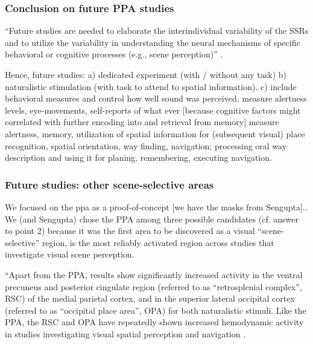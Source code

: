 \subsubsection{Conclusion on future PPA studies}

``Future studies are needed to elaborate the interindividual variability of the
SSRs and to utilize the variability in understanding the neural mechanisms of
specific behavioral or cognitive processes (e.g., scene perception)''
\citep{zhen2017quantifying}.

Hence, future studies:
%
a) dedicated experiment (with / without any task)
%
b) naturalistic stimulation (with task to attend to spatial information).
%
c) include behavioral measures and control how well sound was perceived, measure
alertness levels, eye-movements, self-reports of what ever [because cognitive
factors might correlated with further encoding into and retrieval from memory]
%
measure alertness, memory, utilization of spatial information for (subsequent
visual) place recognition, spatial orientation, way finding, navigation;
%
processing oral way description and using it for planing,
remembering, executing navigation.


\subsubsection{Future studies: other scene-selective areas}


We focused on the \ac{ppa} as a proof-of-concept [we have the masks from
Sengupta]..
%
We (and Sengupta) chose the PPA among three possible candidates (cf. answer to
point 2) because it was the first area to be discovered as a visual
``scene-selective'' region, is the most reliably activated region across studies
that investigate visual scene perception.

``Apart from the PPA, results show significantly increased activity in the
ventral precuneus and posterior cingulate region (referred to as ``retrosplenial
complex'', RSC) of the medial parietal cortex, and in the superior lateral
occipital cortex (referred to as ``occipital place area'', OPA) for both
naturalistic stimuli.
Like the PPA, the RSC and OPA have repeatedly shown increased hemodynamic
activity in studies investigating visual spatial perception and navigation
\citep{chrastil2018heterogeneity, bettencourt2013role, dilks2013occipital,
epstein2019scene}.

